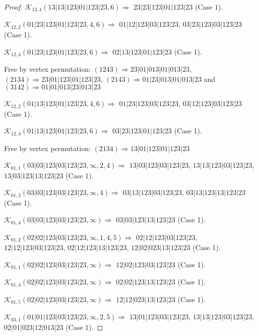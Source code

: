 \documentclass[12pt]{article}
\theoremstyle{plain}
\theoremstyle{definition}
\theoremstyle{remark}
\newcommand{\fancy}[1]{\mathcal{#1}}
\def\K{\fancy{K}}
\begin{document}
\begin{proof}
	$\K_{12,4}(13|13|123|01|123|23,6)\Rightarrow $ $23|23|123|01|123|23$ (Case 1).
	
	
	\bigskip
	
	$\K_{12,2}(01|23|123|01|123|23,4, 6)\Rightarrow $ $01|12|123|03|123|23$, $03|23|123|03|123|23$ (Case 1).
	
	$\K_{12,4}(01|23|123|01|123|23,6)\Rightarrow $ $02|13|123|01|123|23$ (Case 1).
	
	
	
	Free by vertex permutation: $(1 2 4 3)\Rightarrow 23|01|013|01|013|23$, $(2 1 3 4)\Rightarrow 23|01|123|01|123|23$, $(2 1 4 3)\Rightarrow 01|23|013|01|013|23$ and $(3 1 4 2)\Rightarrow 01|01|013|23|013|23$
	
	
	
	\bigskip
	
	$\K_{12,2}(01|13|123|01|123|23,4, 6)\Rightarrow $ $01|23|123|03|123|23$, $03|12|123|03|123|23$ (Case 1).
	
	$\K_{12,4}(01|13|123|01|123|23,6)\Rightarrow $ $03|23|123|01|123|23$ (Case 1).
	
	
	
	Free by vertex permutation: $(2 1 3 4)\Rightarrow 13|01|123|01|123|23$
	
	
	
	\bigskip
	
	$\K_{01,1}(03|03|123|03|123|23,\infty,2, 4)\Rightarrow $ $13|03|123|03|123|23$, $13|13|123|03|123|23$, $13|03|123|13|123|23$ (Case 1).
	
	$\K_{01,2}(03|03|123|03|123|23,\infty,4)\Rightarrow $ $03|13|123|03|123|23$, $03|13|123|13|123|23$ (Case 1).
	
	$\K_{01,4}(03|03|123|03|123|23,\infty)\Rightarrow $ $03|03|123|13|123|23$ (Case 1).
	
	
	\bigskip
	
	$\K_{01,2}(02|02|123|03|123|23,\infty,1, 4, 5)\Rightarrow $ $02|12|123|03|123|23$, $12|12|123|03|123|23$, $02|12|123|13|123|23$, $12|02|023|13|123|23$ (Case 1).
	
	$\K_{01,1}(02|02|123|03|123|23,\infty)\Rightarrow $ $12|02|123|03|123|23$ (Case 1).
	
	$\K_{01,4}(02|02|123|03|123|23,\infty)\Rightarrow $ $02|02|123|13|123|23$ (Case 1).
	
	$\K_{01,5}(02|02|123|03|123|23,\infty)\Rightarrow $ $12|12|023|13|123|23$ (Case 1).
	
	
	\bigskip
	
	$\K_{03,1}(01|01|123|03|123|23,\infty,2, 5)\Rightarrow $ $13|01|123|03|123|23$, $13|13|123|03|123|23$, $02|01|023|12|013|23$ (Case 1).
	

\end{proof}
\end{document}
